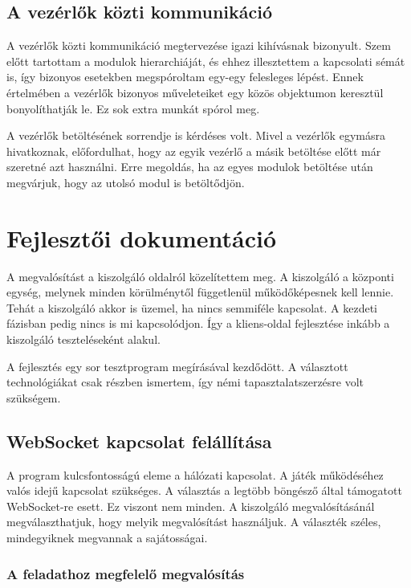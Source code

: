 \documentclass[]{article}
\begin{document}
\subsection{A vezérlők közti
kommunikáció}

A vezérlők közti kommunikáció megtervezése igazi kihívásnak bizonyult.
Szem előtt tartottam a modulok hierarchiáját, és ehhez illesztettem a
kapcsolati sémát is, így bizonyos esetekben megspóroltam egy-egy
felesleges lépést. Ennek értelmében a vezérlők bizonyos műveleteiket egy
közös objektumon keresztül bonyolíthatják le. Ez sok extra munkát spórol
meg.

A vezérlők betöltésének sorrendje is kérdéses volt. Mivel a vezérlők
egymásra hivatkoznak, előfordulhat, hogy az egyik vezérlő a másik
betöltése előtt már szeretné azt használni. Erre megoldás, ha az egyes
modulok betöltése után megvárjuk, hogy az utolsó modul is betöltődjön.


\section{Fejlesztői
dokumentáció}

A megvalósítást a kiszolgáló oldalról közelítettem meg. A kiszolgáló a
központi egység, melynek minden körülménytől függetlenül működőképesnek
kell lennie. Tehát a kiszolgáló akkor is üzemel, ha nincs semmiféle
kapcsolat. A kezdeti fázisban pedig nincs is mi kapcsolódjon. Így a
kliens-oldal fejlesztése inkább a kiszolgáló teszteléseként alakul.

A fejlesztés egy sor tesztprogram megírásával kezdődött. A választott
technológiákat csak részben ismertem, így némi tapasztalatszerzésre volt
szükségem.


\subsection{WebSocket kapcsolat
felállítása}

A program kulcsfontosságú eleme a hálózati kapcsolat. A játék
működéséhez valós idejű kapcsolat szükséges. A választás a legtöbb
böngésző által támogatott WebSocket-re esett. Ez viszont nem minden. A
kiszolgáló megvalósításánál megválaszthatjuk, hogy melyik megvalósítást
használjuk. A választék széles, mindegyiknek megvannak a sajátosságai.


\subsubsection{A feladathoz megfelelő
megvalósítás}
\end{document}
